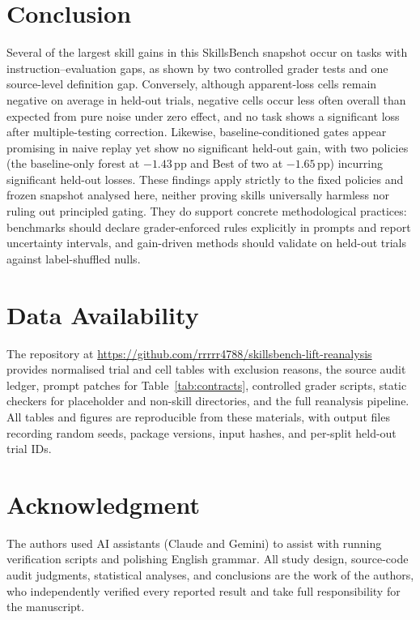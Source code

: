 \documentclass[10pt,conference]{IEEEtran}
\newif\ifkeepcuts \keepcutstrue
\newcommand{\cut}[1]{\ifkeepcuts #1\fi}
\begin{document}
\section{Conclusion}
Several of the largest skill gains in this SkillsBench snapshot occur on tasks with instruction--evaluation gaps, as shown by two controlled grader tests and one source-level definition gap. Conversely, although apparent-loss cells remain negative on average in held-out trials, negative cells occur less often overall than expected from pure noise under zero effect, and no task shows a significant loss after multiple-testing correction. Likewise, baseline-conditioned gates appear promising in naive replay yet show no significant held-out gain, with two policies (the baseline-only forest at $-1.43$\,pp and Best of two at $-1.65$\,pp) incurring significant held-out losses. These findings apply strictly to the fixed policies and frozen snapshot analysed here, neither proving skills universally harmless nor ruling out principled gating. They do support concrete methodological practices: benchmarks should declare grader-enforced rules explicitly in prompts and report uncertainty intervals, and gain-driven methods should validate on held-out trials against label-shuffled nulls.

\section*{Data Availability}
The repository at \url{https://github.com/rrrrr4788/skillsbench-lift-reanalysis} provides normalised trial and cell tables with exclusion reasons, the source audit ledger, prompt patches for Table~\ref{tab:contracts}, controlled grader scripts, static checkers for placeholder and non-skill directories, and the full reanalysis pipeline.\cut{ All tables and figures are reproducible from these materials, with output files recording random seeds, package versions, input hashes, and per-split held-out trial IDs.}

\section*{Acknowledgment}
The authors used AI assistants (Claude and Gemini) to assist with running verification scripts and polishing English grammar. All study design, source-code audit judgments, statistical analyses, and conclusions are the work of the authors, who independently verified every reported result and take full responsibility for the manuscript.



\end{document}
